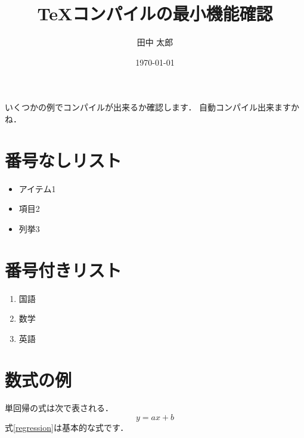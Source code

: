 \documentclass{jsarticle}
\begin{document}
\title{\huge TeXコンパイルの最小機能確認}
\author{田中 太郎}
\date{\today}
\maketitle

いくつかの例でコンパイルが出来るか確認します．
自動コンパイル出来ますかね．

\section{番号なしリスト}
\begin{itemize}
  \item アイテム1
  \item 項目2
  \item 列挙3
\end{itemize}

\section{番号付きリスト}
\begin{enumerate}
  \item 国語
  \item 数学
  \item 英語
\end{enumerate}

\section{数式の例}
単回帰の式は次で表される．
\begin{equation}
  y = ax + b \label{regression}
\end{equation}
式\eqref{regression}は基本的な式です．
\end{document}
